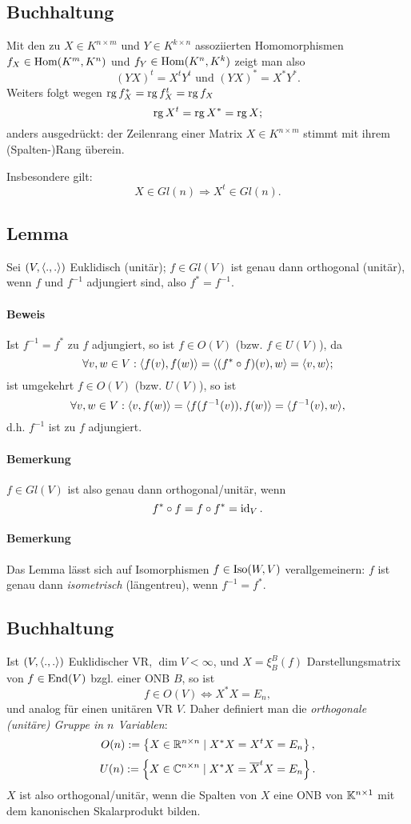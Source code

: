 \subsection{Buchhaltung}
	Mit den zu $ X\in K^{n\times m} $ und $ Y\in K^{k\times n} $ assoziierten Homomorphismen $ f_X\in \operatorname{Hom}(K^m,K^n) $ und $ f_Y\in \operatorname{Hom}(K^n,K^k) $ zeigt man also
		\[ (YX)^t = X^tY^t \text{ und } (YX)^* = X^*Y^*. \]
	Weiters folgt wegen $ \operatorname{rg} f_X^* = \operatorname{rg} f_X^t = \operatorname{rg} f_X $
		\[ \operatorname{rg} X^t = \operatorname{rg} X^* = \operatorname{rg} X; \]
	anders ausgedrückt: der Zeilenrang einer Matrix $ X\in K^{n\times m} $ stimmt mit ihrem (Spalten-)Rang überein.
	
	Insbesondere gilt:
		\[ X\in Gl(n) \Rightarrow X^t \in Gl(n). \]
		
\subsection{Lemma}
\begin{Lemma}[]
	Sei $ (V,\langle .,. \rangle) $ Euklidisch (unitär); $ f\in Gl(V) $ ist genau dann orthogonal (unitär), wenn $ f $ und $ f^{-1} $ adjungiert sind, also $  f^*=f^{-1} $.
\end{Lemma}
\paragraph{Beweis}
	Ist $ f^{-1}=f^* $ zu $ f $ adjungiert, so ist $ f\in O(V) $ (bzw. $ f\in U(V) $), da
		\[ \forall v,w\in V: \langle f(v),f(w) \rangle = \langle (f^*\circ f)(v),w \rangle = \langle v,w \rangle; \]
	ist umgekehrt $ f\in O(V) $ (bzw. $ U(V) $), so ist
		\[ \forall v,w\in V: \langle v,f(w) \rangle = \langle f(f^{-1}(v)),f(w) \rangle = \langle f^{-1}(v),w \rangle, \]
	d.h. $ f^{-1} $ ist zu $ f $ adjungiert.
\paragraph{Bemerkung}
	$ f\in Gl(V) $ ist also genau dann orthogonal/unitär, wenn
		\[ f^*\circ f = f\circ f^* = \operatorname{id}_V. \]
\paragraph{Bemerkung}
	Das Lemma lässt sich auf Isomorphismen $ f\in \operatorname{Iso}(W,V) $ verallgemeinern:
	$ f $ ist genau dann \emph{isometrisch} (längentreu), wenn $ f^{-1} = f^* $.

\subsection{Buchhaltung}
	Ist $ (V,\langle .,. \rangle) $ Euklidischer VR, $ \dim V <\infty $,
	und $ X=\xi_B^B(f) $ Darstellungsmatrix von $ f\in \operatorname{End}(V) $ bzgl. einer ONB $ B $,
	so ist
		\[ f\in O(V)\Leftrightarrow X^*X = E_n, \]
	und analog für einen unitären VR $ V $.
	Daher definiert man die \emph{orthogonale (unitäre) Gruppe in $ n $ Variablen}:
		\[ O(n) := \left\{X\in \mathbb{R}^{n\times n}\mid X^*X = X^tX = E_n \right\}, \]
		\[ U(n) := \left\{X\in \mathbb{C}^{n\times n}\mid X^*X = \overline{X}^tX = E_n\right\}.\]
	$ X $ ist also orthogonal/unitär, wenn die Spalten von $ X $ eine ONB von $ \mathbb{K}^{n\times 1} $ mit dem kanonischen Skalarprodukt bilden.

